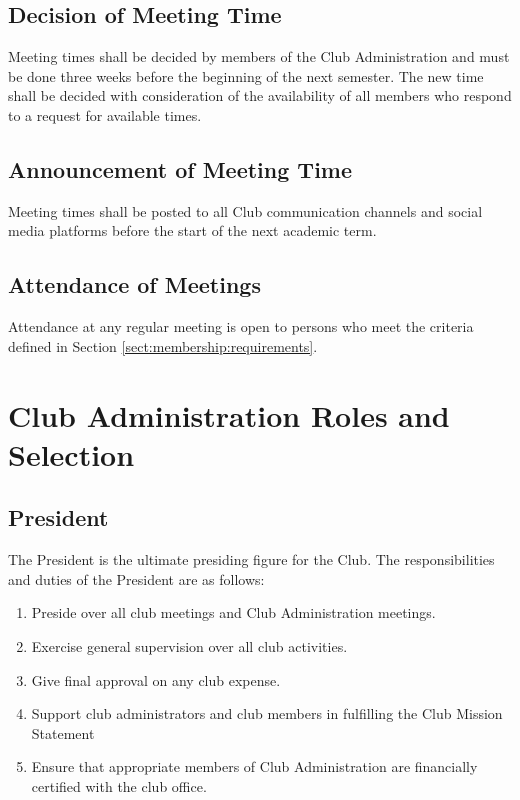 \documentclass[english,11pt]{article}
\begin{document}
\subsection{Decision of Meeting Time} \label{sect:meetings:decision}
Meeting times shall be decided by members of the Club Administration and must be done three weeks before the beginning of the next semester.
The new time shall be decided with consideration of the availability of all members who respond to a request for available times.

\subsection{Announcement of Meeting Time} \label{sect:meetings:announcement}
Meeting times shall be posted to all Club communication channels and social media platforms before the start of the next academic term.

\subsection{Attendance of Meetings} \label{sect:meetings:attendance}
Attendance at any regular meeting is open to persons who meet the criteria defined in Section \ref{sect:membership:requirements}.

\section{Club Administration Roles and Selection} \label{act:cadmin}
\subsection{President} \label{sect:cadmin:president}
The President is the ultimate presiding figure for the Club.
The responsibilities and duties of the President are as follows:

\begin{enumerate}[label=\Alph*.]
    \item Preside over all club meetings and Club Administration meetings.
    \item Exercise general supervision over all club activities.
    \item Give final approval on any club expense.
    \item Support club administrators and club members in fulfilling the Club Mission Statement
    \item Ensure that appropriate members of Club Administration are financially certified with the club office.
\end{enumerate}
\end{document}
